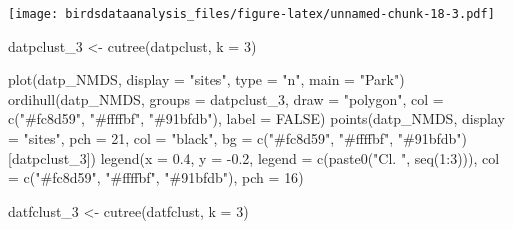 \documentclass[
]{article}
\newenvironment{Shaded}{\begin{snugshade}}{\end{snugshade}}
\newcommand{\AttributeTok}[1]{\textcolor[rgb]{0.77,0.63,0.00}{#1}}
\newcommand{\ConstantTok}[1]{\textcolor[rgb]{0.00,0.00,0.00}{#1}}
\newcommand{\DecValTok}[1]{\textcolor[rgb]{0.00,0.00,0.81}{#1}}
\newcommand{\FloatTok}[1]{\textcolor[rgb]{0.00,0.00,0.81}{#1}}
\newcommand{\FunctionTok}[1]{\textcolor[rgb]{0.00,0.00,0.00}{#1}}
\newcommand{\NormalTok}[1]{#1}
\newcommand{\OtherTok}[1]{\textcolor[rgb]{0.56,0.35,0.01}{#1}}
\newcommand{\SpecialCharTok}[1]{\textcolor[rgb]{0.00,0.00,0.00}{#1}}
\newcommand{\StringTok}[1]{\textcolor[rgb]{0.31,0.60,0.02}{#1}}
\begin{document}
\texttt{[image: birdsdataanalysis\_files/figure-latex/unnamed-chunk-18-3.pdf]}

\begin{Shaded}
\begin{Highlighting}[]
\NormalTok{datpclust\_3 }\OtherTok{\textless{}{-}} \FunctionTok{cutree}\NormalTok{(datpclust, }\AttributeTok{k =} \DecValTok{3}\NormalTok{)}

\FunctionTok{plot}\NormalTok{(datp\_NMDS, }\AttributeTok{display =} \StringTok{"sites"}\NormalTok{, }\AttributeTok{type =} \StringTok{"n"}\NormalTok{, }\AttributeTok{main =} \StringTok{"Park"}\NormalTok{)}
\FunctionTok{ordihull}\NormalTok{(datp\_NMDS, }\AttributeTok{groups =}\NormalTok{ datpclust\_3,}
         \AttributeTok{draw =} \StringTok{"polygon"}\NormalTok{, }\AttributeTok{col =} \FunctionTok{c}\NormalTok{(}\StringTok{"\#fc8d59"}\NormalTok{, }\StringTok{"\#ffffbf"}\NormalTok{, }\StringTok{"\#91bfdb"}\NormalTok{),}
         \AttributeTok{label =} \ConstantTok{FALSE}\NormalTok{)}
\FunctionTok{points}\NormalTok{(datp\_NMDS, }\AttributeTok{display =} \StringTok{"sites"}\NormalTok{, }\AttributeTok{pch =} \DecValTok{21}\NormalTok{, }\AttributeTok{col =} \StringTok{"black"}\NormalTok{,}
       \AttributeTok{bg =} \FunctionTok{c}\NormalTok{(}\StringTok{"\#fc8d59"}\NormalTok{, }\StringTok{"\#ffffbf"}\NormalTok{, }\StringTok{"\#91bfdb"}\NormalTok{)[datpclust\_3])}
\FunctionTok{legend}\NormalTok{(}\AttributeTok{x =} \FloatTok{0.4}\NormalTok{, }\AttributeTok{y =} \SpecialCharTok{{-}}\FloatTok{0.2}\NormalTok{, }\AttributeTok{legend =} \FunctionTok{c}\NormalTok{(}\FunctionTok{paste0}\NormalTok{(}\StringTok{"Cl. "}\NormalTok{, }\FunctionTok{seq}\NormalTok{(}\DecValTok{1}\SpecialCharTok{:}\DecValTok{3}\NormalTok{))),}
       \AttributeTok{col =} \FunctionTok{c}\NormalTok{(}\StringTok{"\#fc8d59"}\NormalTok{, }\StringTok{"\#ffffbf"}\NormalTok{, }\StringTok{"\#91bfdb"}\NormalTok{), }\AttributeTok{pch =} \DecValTok{16}\NormalTok{)}

\NormalTok{datfclust\_3 }\OtherTok{\textless{}{-}} \FunctionTok{cutree}\NormalTok{(datfclust, }\AttributeTok{k =} \DecValTok{3}\NormalTok{)}


\end{Highlighting}
\end{Shaded}
\end{document}
